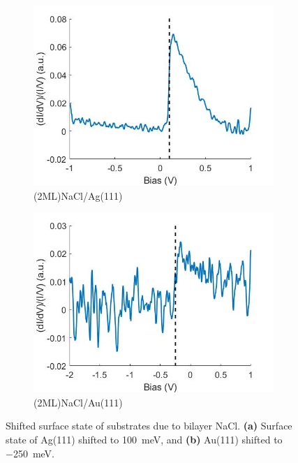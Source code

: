 \begin{figure} [H]
    \centering
    \begin{subfigure}[t]{0.49\textwidth}
    \includegraphics[width=\textwidth]{pictures/2mlnacl_ag111_surface_state.jpg}
    \caption{(2ML)NaCl/Ag(111)}
    \end{subfigure}
    \hfill
    \begin{subfigure}[t]{0.49\textwidth}
    \includegraphics[width=\textwidth]{pictures/2mlnacl_au111_surface_state.jpg}
    \caption{(2ML)NaCl/Au(111)}
    \end{subfigure}
    
    \caption{Shifted surface state of substrates due to bilayer NaCl. \textbf{(a)} Surface state of Ag(111) shifted to \SI{+100}{meV}, and \textbf{(b)} Au(111) shifted to \SI{-250}{meV}.}
    \label{fig:expsetup:NaClstate}
\end{figure}

